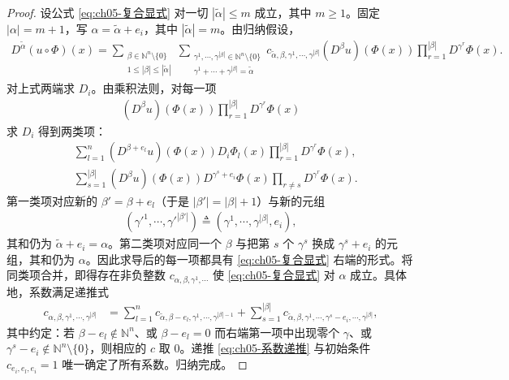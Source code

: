 \documentclass[../../main.tex]{subfiles}
\begin{document}
\begin{proof}
设公式 \eqref{eq:ch05-复合显式} 对一切 $|\tilde\alpha|\leqslant m$ 成立，其中 $m\geqslant1$。固定 $|\alpha|=m+1$，写 $\alpha=\tilde\alpha+e_i$，其中 $|\tilde\alpha|=m$。由归纳假设，
\begin{align}
D^{\tilde\alpha}(u\circ\Phi)(x)
=\sum_{\substack{\beta\in\mathbb{N}^{n}\setminus\{0\}\\ 1\leqslant|\beta|\leqslant|\tilde\alpha|}}
\sum_{\substack{\gamma^{1},\cdots,\gamma^{|\beta|}\in\mathbb{N}^{n}\setminus\{0\}\\ \gamma^{1}+\cdots+\gamma^{|\beta|}=\tilde\alpha}}
c_{\tilde\alpha,\beta,\gamma^{1},\cdots,\gamma^{|\beta|}}
(D^{\beta}u)(\Phi(x))\prod_{r=1}^{|\beta|}D^{\gamma^{r}}\Phi(x).
\label{eq:ch05-归纳假设}
\end{align}
对上式两端求 $D_i$。由乘积法则，对每一项
\begin{align*}
(D^{\beta}u)(\Phi(x))\prod_{r=1}^{|\beta|}D^{\gamma^{r}}\Phi(x)
\end{align*}
求 $D_i$ 得到两类项：
\begin{align}
&\sum_{l=1}^{n}(D^{\beta+e_l}u)(\Phi(x))D_i\Phi_l(x)\prod_{r=1}^{|\beta|}D^{\gamma^{r}}\Phi(x),\label{eq:ch05-第一类}\\
&\sum_{s=1}^{|\beta|}(D^{\beta}u)(\Phi(x))D^{\gamma^{s}+e_i}\Phi(x)\prod_{r\ne s}D^{\gamma^{r}}\Phi(x).\label{eq:ch05-第二类}
\end{align}
第一类项对应新的 $\beta'=\beta+e_l$（于是 $|\beta'|=|\beta|+1$）与新的元组
\begin{align*}
(\gamma'^{1},\cdots,\gamma'^{|\beta'|})\triangleq(\gamma^{1},\cdots,\gamma^{|\beta|},e_i),
\end{align*}
其和仍为 $\tilde\alpha+e_i=\alpha$。第二类项对应同一个 $\beta$ 与把第 $s$ 个 $\gamma^{s}$ 换成 $\gamma^{s}+e_i$ 的元组，其和仍为 $\alpha$。因此求导后的每一项都具有 \eqref{eq:ch05-复合显式} 右端的形式。将同类项合并，即得存在非负整数 $c_{\alpha,\beta,\gamma^{1},\cdots}$ 使 \eqref{eq:ch05-复合显式} 对 $\alpha$ 成立。具体地，系数满足递推式
\begin{align}
c_{\alpha,\beta,\gamma^{1},\cdots,\gamma^{|\beta|}}
&=\sum_{l=1}^{n}c_{\tilde\alpha,\beta-e_l,\gamma^{1},\cdots,\gamma^{|\beta|-1}}
+\sum_{s=1}^{|\beta|}c_{\tilde\alpha,\beta,\gamma^{1},\cdots,\gamma^{s}-e_i,\cdots,\gamma^{|\beta|}},
\label{eq:ch05-系数递推}
\end{align}
其中约定：若 $\beta-e_l\notin\mathbb{N}^{n}$、或 $\beta-e_l=0$ 而右端第一项中出现零个 $\gamma$、或 $\gamma^{s}-e_i\notin\mathbb{N}^{n}\setminus\{0\}$，则相应的 $c$ 取 $0$。递推 \eqref{eq:ch05-系数递推} 与初始条件 $c_{e_i,e_l,e_i}=1$ 唯一确定了所有系数。归纳完成。


\end{proof}
\end{document}
